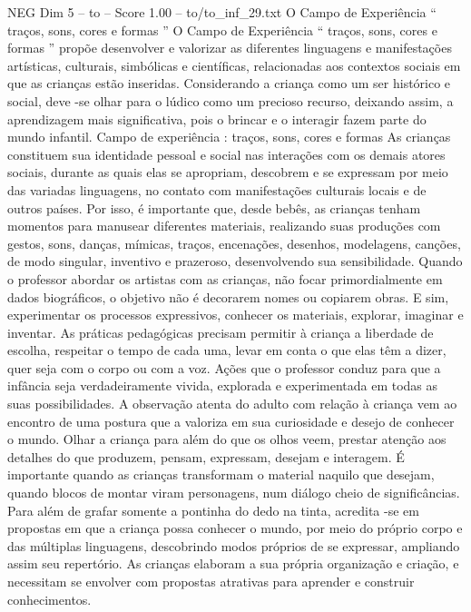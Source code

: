 \begin{textsample}{NEG Dim 5 – to – Score 1.00 – to/to\_inf\_29.txt}  \label{ex:f5_neg_266}
O Campo de Experiência “ traços, sons, cores e formas ” O Campo de Experiência “ traços, sons, cores e formas ” propõe desenvolver e valorizar as diferentes linguagens e manifestações artísticas, culturais, simbólicas e científicas, relacionadas aos contextos sociais em que as crianças estão inseridas.
Considerando a criança como um ser histórico e social, deve -se olhar para o lúdico como um precioso recurso, deixando assim, a aprendizagem mais significativa, pois o brincar e o interagir fazem parte do mundo infantil.
Campo de experiência : traços, sons, cores e formas As crianças constituem sua identidade pessoal e social nas interações com os demais atores sociais, durante as quais elas se apropriam, descobrem e se expressam por meio das variadas linguagens, no contato com manifestações culturais locais e de outros países.
Por isso, é importante que, desde bebês, as crianças tenham momentos para manusear diferentes materiais, realizando suas produções com gestos, sons, danças, mímicas, traços, encenações, desenhos, modelagens, canções, de modo singular, inventivo e prazeroso, desenvolvendo sua sensibilidade.
Quando o professor abordar os artistas com as crianças, não focar primordialmente em dados biográficos, o objetivo não é decorarem nomes ou copiarem obras.
E sim, experimentar os processos expressivos, conhecer os materiais, explorar, imaginar e inventar.
As práticas pedagógicas precisam permitir à criança a liberdade de escolha, respeitar o tempo de cada uma, levar em conta o que elas têm a dizer, quer seja com o corpo ou com a voz.
Ações que o professor conduz para que a infância seja verdadeiramente vivida, explorada e experimentada em todas as suas possibilidades.
A observação atenta do adulto com relação à criança vem ao encontro de uma postura que a valoriza em sua curiosidade e desejo de conhecer o mundo.
Olhar a criança para além do que os olhos veem, prestar atenção aos detalhes do que produzem, pensam, expressam, desejam e interagem.
É importante quando as crianças transformam o material naquilo que desejam, quando blocos de montar viram personagens, num diálogo cheio de significâncias.
Para além de grafar somente a pontinha do dedo na tinta, acredita -se em propostas em que a criança possa conhecer o mundo, por meio do próprio corpo e das múltiplas linguagens, descobrindo modos próprios de se expressar, ampliando assim seu repertório.
As crianças elaboram a sua própria organização e criação, e necessitam se envolver com propostas atrativas para aprender e construir conhecimentos.

\end{textsample}
